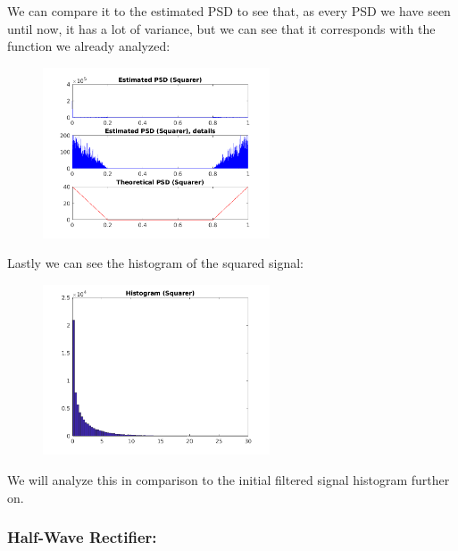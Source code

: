 \documentclass[a4paper,11pt]{article}
\begin{document}
\newpage

We can compare it to the estimated PSD to see that, as every PSD we have seen
until now, it has a lot of variance, but we can see that it corresponds with
the function we already analyzed:

\begin{figure}[!hp]
    \begin{center}
      \includegraphics[width=0.6\textwidth]{images/study3/comp_psd_sq.png}
    \end{center}
\end{figure}

Lastly we can see the histogram of the squared signal:

\begin{figure}[!hp]
    \begin{center}
      \includegraphics[width=0.6\textwidth]{images/study3/hist_sq.png}
    \end{center}
\end{figure}

We will analyze this in comparison to the initial filtered signal histogram
further on.

\newpage

\subsubsection{Half-Wave Rectifier:}
\end{document}
